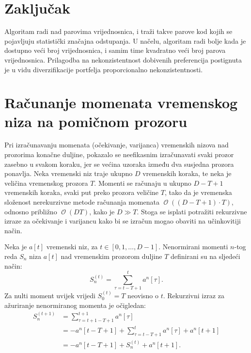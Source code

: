 \documentclass[lmodern, utf8, diplomski, numeric]{fer}
\newcommand{\bigO}[1]{\operatorname{\mathcal{O}}\q(#1\w)}
\newcommand{\q}{\left}
\newcommand{\w}{\right}
\begin{document}
  \chapter{Zaključak}
  Algoritam radi nad parovima vrijednosnica, i traži takve parove kod kojih se pojavljuju statistički značajna odstupanja.
  U načelu, algoritam radi bolje kada je dostupno veći broj vrijednosnica, i samim time kvadratno veći broj parova vrijednosnica.
  Prilagodba na nekonzistentnost dobivenih preferencija postignuta je u vidu diverzifikacije portfelja proporcionalno nekonzistentnosti.
  
  
  

  \appendix
  \chapter{Računanje momenata vremenskog niza na pomičnom prozoru}
  Pri izračunavanju momenata (očekivanje, varijanca) vremenskih nizova nad prozorima konačne duljine, pokazalo se neefikasnim izračunavati svaki prozor zasebno u svakom koraku, jer se većina uzoraka između dva susjedna prozora ponavlja.
  Neka vremenski niz traje ukupno $D$ vremenskih koraka, te neka je veličina vremenskog prozora $T$.
  Momenti se računaju u ukupno $D - T + 1$ vremenskih koraka, svaki put preko prozora veličine $T$, tako da je vremenska složenost nerekurzivne metode računanja momenata $\bigO{\q(D - T + 1\w)\cdot T}$, odnosno približno $\bigO{DT}$, kako je $D \gg T$.
  Stoga se isplati potražiti rekurzivne izraze za očekivanje i varijancu kako bi se izračun mogao obaviti na učinkovitiji način.
  
  Neka je $a\q[t\w]$ vremenski niz, za $t \in \q[0, 1, \ldots, D - 1\w]$.
  Nenormirani momenti $n$-tog reda $S_n$ niza $a\q[t\w]$ nad vremenskim prozorom duljine $T$ definirani su na sljedeći način:
  \begin{equation}
  \label{eq:nonnorm}
  S_n^{(t)} = \sum_{\tau=t-T+1}^{t} a^n\q[\tau\w].
  \end{equation}
  Za nulti moment uvijek vrijedi $S_0^{(t)} = T$ neovisno o $t$.
  Rekurzivni izraz za ažuriranje nenormiranog momenta je očigledan:
  \begin{align}
  S_n^{(t+1)} &= \sum_{\tau=t+1-T+1}^{t+1} a^n\q[\tau\w] \nonumber \\
    &= -a^n\q[t-T+1\w] + \sum_{\tau=t-T+1}^{t} a^n\q[\tau\w] + a^n\q[t+1\w] \nonumber \\
    \label{eq:rec}
    &= -a^n\q[t-T+1\w] + S_n^{(t)} + a^n\q[t+1\w].
  \end{align}
  
\end{document}

